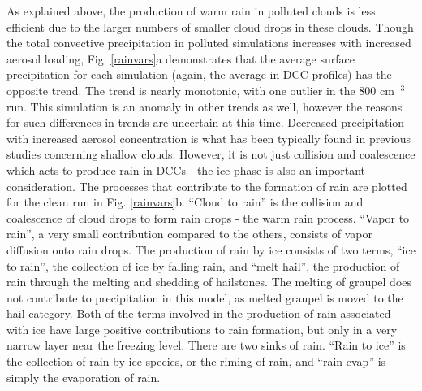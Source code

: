 As explained above, the production of warm rain in polluted clouds is less efficient due to the larger numbers of smaller cloud drops in these clouds.  Though the total convective precipitation in polluted simulations increases with increased aerosol loading, Fig. \ref{rainvars}a demonstrates that the average surface precipitation for each simulation (again, the average in DCC profiles) has the opposite trend.  The trend is nearly monotonic, with one outlier in the 800 cm$^{-3}$ run.  This simulation is an anomaly in other trends as well, however the reasons for such differences in trends are uncertain at this time.
\newpage
Decreased precipitation with increased aerosol concentration is what has been typically found in previous studies concerning shallow clouds.  However, it is not just collision and coalescence which acts to produce rain in DCCs - the ice phase is also an important consideration.  The processes that contribute to the formation of rain are plotted for the clean run in Fig. \ref{rainvars}b.  ``Cloud to rain'' is the collision and coalescence of cloud drops to form rain drops - the warm rain process.  ``Vapor to rain'', a very small contribution compared to the others, consists of vapor diffusion onto rain drops.  The production of rain by ice consists of two terms,  ``ice to rain'', the collection of ice by falling rain, and ``melt hail'', the production of rain through the melting and shedding of hailstones.  The melting of graupel does not contribute to precipitation in this model, as melted graupel is moved to the hail category.  Both of the terms involved in the production of rain associated with ice have large positive contributions to rain formation, but only in a very  narrow layer near the freezing level.  There are two sinks of rain.  ``Rain to ice'' is the collection of rain by ice species, or the riming of rain, and ``rain evap'' is simply the evaporation of rain.

